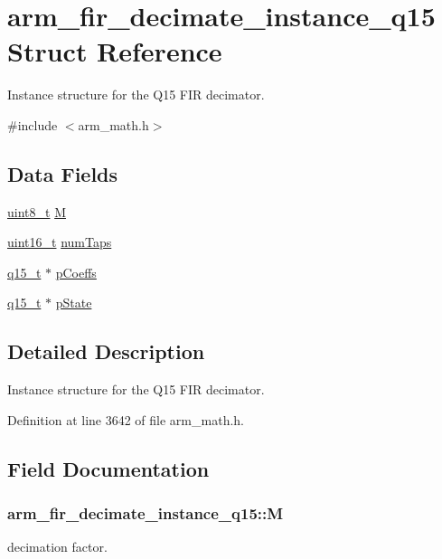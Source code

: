 \hypertarget{structarm__fir__decimate__instance__q15}{\section{arm\-\_\-fir\-\_\-decimate\-\_\-instance\-\_\-q15 Struct Reference}
\label{structarm__fir__decimate__instance__q15}
}


Instance structure for the Q15 F\-I\-R decimator.  




{\ttfamily \#include $<$arm\-\_\-math.\-h$>$}

\subsection*{Data Fields}
\begin{DoxyCompactItemize}
\item 
\hyperlink{stdint_8h_aba7bc1797add20fe3efdf37ced1182c5}{uint8\-\_\-t} \hyperlink{structarm__fir__decimate__instance__q15_aad9320284218b3aa378527ea518cf093}{M}
\item 
\hyperlink{stdint_8h_a273cf69d639a59973b6019625df33e30}{uint16\-\_\-t} \hyperlink{structarm__fir__decimate__instance__q15_ac1e9844488ec717da334fbd4c4f41990}{num\-Taps}
\item 
\hyperlink{arm__math_8h_ab5a8fb21a5b3b983d5f54f31614052ea}{q15\-\_\-t} $\ast$ \hyperlink{structarm__fir__decimate__instance__q15_a01cacab67e73945e8289075598ede14d}{p\-Coeffs}
\item 
\hyperlink{arm__math_8h_ab5a8fb21a5b3b983d5f54f31614052ea}{q15\-\_\-t} $\ast$ \hyperlink{structarm__fir__decimate__instance__q15_a3f7b5184bb28853ef401b001df121047}{p\-State}
\end{DoxyCompactItemize}


\subsection{Detailed Description}
Instance structure for the Q15 F\-I\-R decimator. 

Definition at line 3642 of file arm\-\_\-math.\-h.



\subsection{Field Documentation}
\hypertarget{structarm__fir__decimate__instance__q15_aad9320284218b3aa378527ea518cf093}{
\subsubsection[{M}]{ arm\-\_\-fir\-\_\-decimate\-\_\-instance\-\_\-q15\-::\-M}}\label{structarm__fir__decimate__instance__q15_aad9320284218b3aa378527ea518cf093}
decimation factor. 

